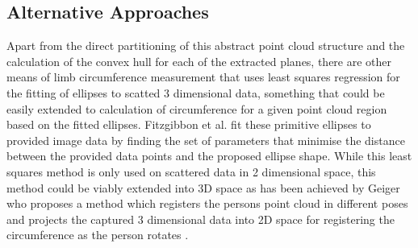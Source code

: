 \subsection{Alternative Approaches}

Apart from the direct partitioning of this abstract point cloud structure and the calculation of the convex hull for each of the extracted planes, there are other means of limb circumference measurement that uses least squares regression for the fitting of ellipses to scatted 3 dimensional data, something that could be easily extended to calculation of circumference for a given point cloud region based on the fitted ellipses. Fitzgibbon et al. \cite{Fitzgibbon1999} fit these primitive ellipses to provided image data by finding the set of parameters that minimise the distance between the provided data points and the proposed ellipse shape.  While this least squares method is only used on scattered data in 2 dimensional space, this method could be viably extended into 3D space as has been achieved by Geiger who proposes a method which registers the persons point cloud in different poses and projects the captured 3 dimensional data into 2D space for registering the circumference as the person rotates \cite{Geiger2011}.


